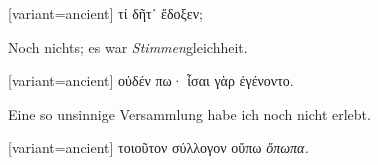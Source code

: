 \switchcolumn

\begin{greek}[variant=ancient]%
τί δῆτ᾽ ἔδοξεν;

\end{greek}%
\switchcolumn*

Noch nichts; es war \emph{Stimmen}gleichheit.

\switchcolumn

\begin{greek}[variant=ancient]%
οὐδέν πω· ἶσαι γὰρ ἐγένοντο.

\end{greek}%
\switchcolumn*

Eine so unsinnige Versammlung habe ich noch nicht erlebt.

\switchcolumn

\begin{greek}[variant=ancient]%
τοιοῦτον σύλλογον οὔπω \emph{ὄπωπα.}

\end{greek}%
